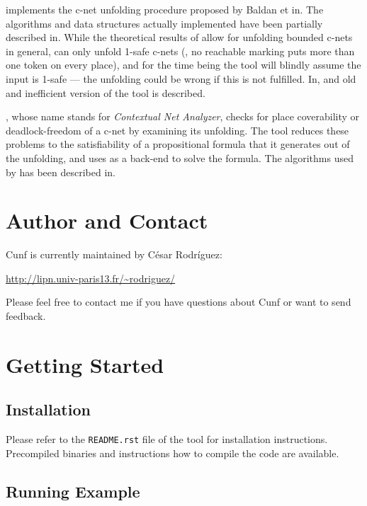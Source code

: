 \documentclass[a4paper]{refart}
\begin{document}
\cunf implements the c-net unfolding procedure proposed by Baldan et
\al in\cite{BCKS08}.  The algorithms and data structures actually
implemented have been partially described in\cite{RSB11,BBCKRS12}.  While
the theoretical results of\cite{BCKS08,RSB11,BBCKRS12} allow for unfolding
bounded c-nets in general, \cunf can only unfold 1-safe c-nets (\ie, no
reachable marking puts more than one token on every place), and for the
time being the tool will blindly assume the input is 1-safe ---
the unfolding could be wrong if this is not fulfilled.
In\cite{Rod10}, and old and inefficient version of the tool is described.

\cna, whose name stands for \emph{Contextual Net Analyzer},
checks for place coverability or deadlock-freedom of a c-net by examining
its unfolding.  The tool reduces these problems to the satisfiability of a
propositional formula that it generates out of the unfolding, and uses
\minisat\cite{ES03} as a back-end to solve the formula.
The algorithms used by \cna has been described in\cite{RS12}.

\section{Author and Contact}%
\label{s:author}

Cunf is currently maintained by César Rodríguez:

\begin{center}
\url{http://lipn.univ-paris13.fr/~rodriguez/}
\end{center}

Please feel free to contact me if you have questions about Cunf or want to send feedback.

\section{Getting Started}%
\label{s:getting}

\subsection{Installation}

Please refer to the \verb!README.rst! file of the tool for installation
instructions. Precompiled binaries and instructions how to compile the code are
available.

\subsection{Running Example}
\end{document}
